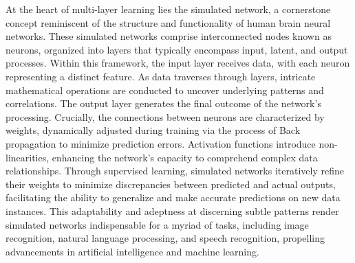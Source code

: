 At the heart of multi-layer learning lies the simulated network, a cornerstone concept reminiscent of the structure and functionality of human brain neural networks. These simulated networks comprise interconnected nodes known as neurons, organized into layers that typically encompass input, latent, and output processes. Within this framework, the input layer receives data, with each neuron representing a distinct feature. As data traverses through layers, intricate mathematical operations are conducted to uncover underlying patterns and correlations. The output layer generates the final outcome of the network's processing. Crucially, the connections between neurons are characterized by weights, dynamically adjusted during training via the process of Back propagation to minimize prediction errors. Activation functions introduce non-linearities, enhancing the network's capacity to comprehend complex data relationships. Through supervised learning, simulated networks iteratively refine their weights to minimize discrepancies between predicted and actual outputs, facilitating the ability to generalize and make accurate predictions on new data instances. This adaptability and adeptness at discerning subtle patterns render simulated networks indispensable for a myriad of tasks, including image recognition, natural language processing, and speech recognition, propelling advancements in artificial intelligence and machine learning.
